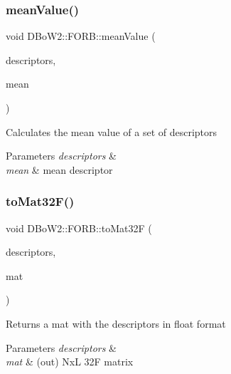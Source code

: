 \subsubsection{\texorpdfstring{mean\+Value()}{meanValue()}}
{\footnotesize\ttfamily void D\+Bo\+W2\+::\+F\+O\+R\+B\+::mean\+Value (\begin{DoxyParamCaption}\item[{const std\+::vector$<$ \mbox{\hyperlink{class_d_bo_w2_1_1_f_o_r_b_ab52a6568044027cf30c8ac1514fed1a6}{p\+Descriptor}} $>$ \&}]{descriptors,  }\item[{\mbox{\hyperlink{class_d_bo_w2_1_1_f_o_r_b_aef9b966d0293836fab9f55f1799ce0ed}{T\+Descriptor}} \&}]{mean }\end{DoxyParamCaption})\hspace{0.3cm}{\ttfamily [static]}}

Calculates the mean value of a set of descriptors 
\begin{DoxyParams}{Parameters}
{\em descriptors} & \\
\hline
{\em mean} & mean descriptor \\
\hline
\end{DoxyParams}
\mbox{\label{class_d_bo_w2_1_1_f_o_r_b_a67b90eaed01dd54e380237c78886635f}} 
\subsubsection{\texorpdfstring{to\+Mat32\+F()}{toMat32F()}}
{\footnotesize\ttfamily void D\+Bo\+W2\+::\+F\+O\+R\+B\+::to\+Mat32F (\begin{DoxyParamCaption}\item[{const std\+::vector$<$ \mbox{\hyperlink{class_d_bo_w2_1_1_f_o_r_b_aef9b966d0293836fab9f55f1799ce0ed}{T\+Descriptor}} $>$ \&}]{descriptors,  }\item[{cv\+::\+Mat \&}]{mat }\end{DoxyParamCaption})\hspace{0.3cm}{\ttfamily [static]}}

Returns a mat with the descriptors in float format 
\begin{DoxyParams}{Parameters}
{\em descriptors} & \\
\hline
{\em mat} & (out) NxL 32F matrix \\
\hline
\end{DoxyParams}
\mbox{\label{class_d_bo_w2_1_1_f_o_r_b_af0a9e2ea44336f2975a7f3324777330c}} 
